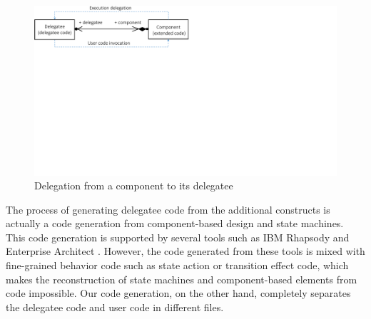  

\begin{figure}
	\centering
	\includegraphics[clip, trim=0cm 14.2cm 16.2cm 0cm, width=\columnwidth]{figures/delegationcomponent.pdf}
	\caption{Delegation from a component to its delegatee} 
	\label{fig:delegation}
\end{figure}



The process of generating delegatee code from the additional constructs is actually a code generation from component-based design and state machines.
This code generation is supported by several tools such as IBM Rhapsody \cite{ibm_rhapsody} and Enterprise Architect \cite{sparxsystems_enterprise_2014}.
However, the code generated from these tools is mixed with fine-grained behavior code such as state action or transition effect code, which makes the reconstruction of state machines and component-based elements from code impossible.
Our code generation, on the other hand, completely separates the delegatee code and user code in different files.

